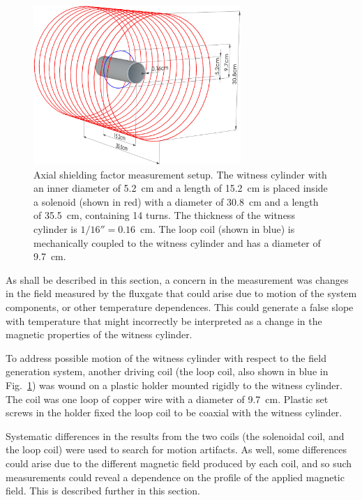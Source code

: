 \begin{figure}
  \begin{center}
    \includegraphics[width=0.7\textwidth]{to_jeff_new4.pdf}
    \caption[Drawing of the axial shielding factor measurement setup
    ]{Axial shielding factor measurement setup. The witness cylinder
      with an inner diameter of 5.2~cm and a length of 15.2~cm is
      placed inside a solenoid (shown in red) with a diameter of
      30.8~cm and a length of 35.5~cm, containing 14 turns.  The
      thickness of the witness cylinder is $1/16''=0.16$~cm.  The loop
      coil (shown in blue) is mechanically coupled to the witness
      cylinder and has a diameter of 9.7~cm.}
    \label{fig:geometry}
  \end{center}
\end{figure}

As shall be described in this section, a concern in the
measurement was changes in the field measured by the fluxgate that
could arise due to motion of the system components, or other
temperature dependences. This could generate a false slope with
temperature that might incorrectly be interpreted as a change in the
magnetic properties of the witness cylinder.

To address possible motion of the witness cylinder with respect to the
field generation system, another driving coil (the loop coil, also
shown in blue in Fig.~\ref{fig:geometry}) was wound on a plastic
holder mounted rigidly to the witness cylinder.  The coil was one loop
of copper wire with a diameter of 9.7~cm.  Plastic set screws in the
holder fixed the loop coil to be coaxial with the witness cylinder.

Systematic differences in the results from the two coils (the
solenoidal coil, and the loop coil) were used to search for motion
artifacts.  As well, some differences could arise due to the different
magnetic field produced by each coil, and so such measurements could
reveal a dependence on the profile of the applied magnetic field.
This is described further in this section.

